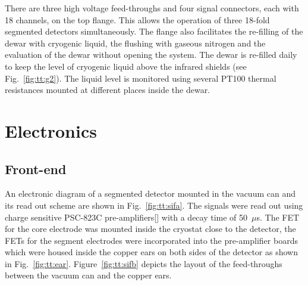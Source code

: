 There are three high voltage feed-throughs and four signal connectors, each with 18 channels, on the top flange. This allows the operation of three 18-fold segmented detectors simultaneously. The flange also facilitates the re-filling of the dewar with cryogenic liquid, the flushing with gaseous nitrogen and the evaluation of the dewar without opening the system. The dewar is re-filled daily to keep the level of cryogenic liquid above the infrared shields (see Fig.~\ref{fig:tt:g2}). The liquid level is monitored using several PT100 thermal resistances mounted at different places inside the dewar.


\section{Electronics} 
\label{sec:tt:ele} 

\subsection{Front-end}
\label{sec:tt:fend} 
An electronic diagram of a segmented detector mounted in the vacuum can and its read out scheme are shown in Fig.~\ref{fig:tt:sifa}. The signals were read out using charge sensitive PSC-823C pre-amplifiers[] with a decay time of 50~$\mu$s. The FET for the core electrode was mounted inside the cryostat close to the detector, the FETs for the segment electrodes were incorporated into the pre-amplifier boards which were housed inside the copper ears on both sides of the detector as shown in Fig.~\ref{fig:tt:ear}. Figure~\ref{fig:tt:sifb} depicts the layout of the feed-throughs between the vacuum can and the copper ears.


